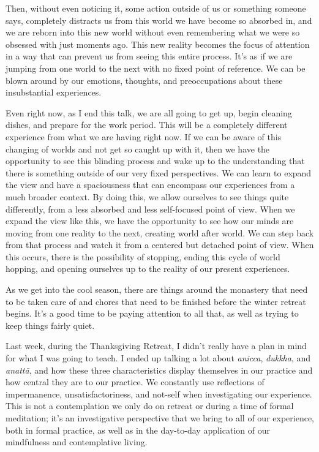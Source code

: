 Then, without even noticing it, some action outside of us or something 
someone says, completely distracts us from this world we have become so 
absorbed in, and we are reborn into this new world without even 
remembering what we were so obsessed with just moments ago. This new 
reality becomes the focus of attention in a way that can prevent us 
from seeing this entire process. It's as if we are jumping from one 
world to the next with no fixed point of reference. We can be blown 
around by our emotions, thoughts, and preoccupations about these 
insubstantial experiences.

Even right now, as I end this talk, we are all going to get up, begin 
cleaning dishes, and prepare for the work period. This will be a 
completely different experience from what we are having right now. If 
we can be aware of this changing of worlds and not get so caught up 
with it, then we have the opportunity to see this blinding process and 
wake up to the understanding that there is something outside of our 
very fixed perspectives. We can learn to expand the view and have a 
spaciousness that can encompass our experiences from a much broader 
context. By doing this, we allow ourselves to see things quite 
differently, from a less absorbed and less self-focused point of view. 
When we expand the view like this, we have the opportunity to see how 
our minds are moving from one reality to the next, creating world after 
world. We can step back from that process and watch it from a centered 
but detached point of view. When this occurs, there is the possibility 
of stopping, ending this cycle of world hopping, and opening ourselves 
up to the reality of our present experiences.


As we get into the cool season, there are things around the monastery 
that need to be taken care of and chores that need to be finished 
before the winter retreat begins. It's a good time to be paying 
attention to all that, as well as trying to keep things fairly quiet.

Last week, during the Thanksgiving Retreat, I didn't really have a plan 
in mind for what I was going to teach. I ended up talking a lot about 
\emph{anicca}, \emph{dukkha}, and \emph{anattā}, and how these three 
characteristics display themselves in our practice and how central they 
are to our practice. We constantly use reflections of impermanence, 
unsatisfactoriness, and not-self when investigating our experience. 
This is not a contemplation we only do on retreat or during a time of 
formal meditation; it's an investigative perspective that we bring to 
all of our experience, both in formal practice, as well as in the 
day-to-day application of our mindfulness and contemplative living.

